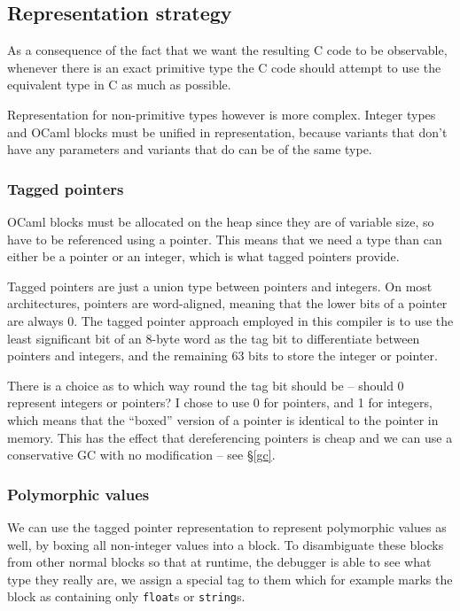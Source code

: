 \subsection{Representation strategy}

As a consequence of the fact that we want the resulting C code to be observable,
whenever there is an exact primitive type the C code should attempt to use the
equivalent type in C as much as possible.

Representation for non-primitive types however is more complex. Integer types
and OCaml blocks must be unified in representation, because variants that don't
have any parameters and variants that do can be of the same type.

\subsubsection{Tagged pointers}

OCaml blocks must be allocated on the heap since they are of variable size, so
have to be referenced using a pointer. This means that we need a type than can
either be a pointer or an integer, which is what tagged pointers provide.

Tagged pointers are just a union type between pointers and integers. On most
architectures, pointers are word-aligned, meaning that the lower bits of a
pointer are always 0. The tagged pointer approach employed in this compiler is
to use the least significant bit of an 8-byte word as the tag bit to
differentiate between pointers and integers, and the remaining 63 bits to store
the integer or pointer.

There is a choice as to which way round the tag bit should be -- should 0 
represent integers or pointers? I chose to use 0 for pointers, and 1 for 
integers, which means that the ``boxed'' version of a pointer is identical to 
the pointer in memory. This has the effect that dereferencing pointers is cheap
and we can use a conservative GC with no modification -- see \S\ref{gc}.

\subsubsection{Polymorphic values}

We can use the tagged pointer representation to represent polymorphic values as
well, by boxing all non-integer values into a block. To disambiguate these
blocks from other normal blocks so that at runtime, the debugger is able to see
what type they really are, we assign a special tag to them which for example
marks the block as containing only \texttt{float}s or \texttt{string}s.

